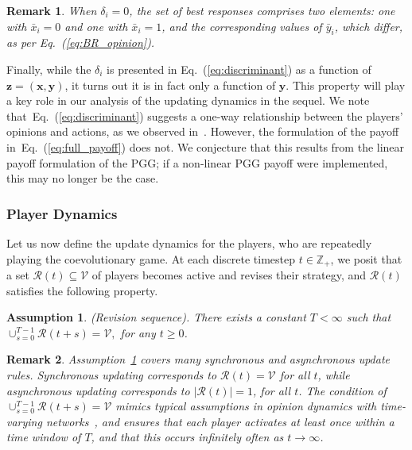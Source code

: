 \documentclass[letterpaper, 10 pt, conference]{ieeeconf}  %
\newcommand{\vect}[1]{\boldsymbol{#1}}
\newtheorem{remark}{Remark}
\newtheorem{assumption}{Assumption}
\renewcommand{\eqref}[1]{Eq.~(\ref{#1})}  %
\begin{document}
\begin{remark}\label{rem:br}When $\delta_i = 0$, the set of best responses comprises two elements: one with $\bar x_i=0$ and one with $\bar x_i=1$, and the corresponding values of $\bar y_i$, which differ, as per \eqref{eq:BR_opinion}.%
\end{remark}
Finally, while the $\delta_i$ is presented in \eqref{eq:discriminant} as a function of $\vect z = (\vect x, \vect y)$, it turns out it is in fact only a function of $\vect y$. This property will play a key role in our analysis of the updating dynamics in the sequel. We note that~\eqref{eq:discriminant} suggests a one-way relationship between the players' opinions and actions, as we observed in~\cite {park_opinions_2021}. However, the formulation of the payoff in~\eqref{eq:full_payoff} does not. We conjecture that this results from the linear payoff formulation of the PGG; if a non-linear PGG payoff were implemented, this may no longer be the case.

\subsubsection*{Player Dynamics}
Let us now define the update dynamics for the players, who are repeatedly playing the coevolutionary game. At each discrete timestep $t \in \mathbb{Z}_+$, we posit that a set $\mathcal{R}(t) \subseteq \mathcal{V}$ of players becomes active and revises their strategy, and $\mathcal R(t)$ satisfies the following property.

\begin{assumption}\label{assumption:revision_sequence}
    (Revision sequence). There exists a constant $T<\infty$ such that $\cup_{s=0}^{T-1}\mathcal{R}(t+s) = \mathcal{V},$ for any $t \geq 0$.
\end{assumption}

\begin{remark}
    Assumption~\ref{assumption:revision_sequence} covers many synchronous and asynchronous update rules. Synchronous updating corresponds to $\mathcal{R}(t) = \mathcal{V}$ for all $t$, while asynchronous updating corresponds to $|\mathcal{R}(t)| = 1$, for all $t$. The condition of $\cup_{s=0}^{T-1}\mathcal{R}(t+s) = \mathcal{V}$ mimics typical assumptions in opinion dynamics with time-varying networks~\cite{proskurnikov_tutorial_2017}, and ensures that each player activates at least once within a time window of $T$, and that this occurs infinitely often as $t\to\infty$. 
\end{remark}
\end{document}
